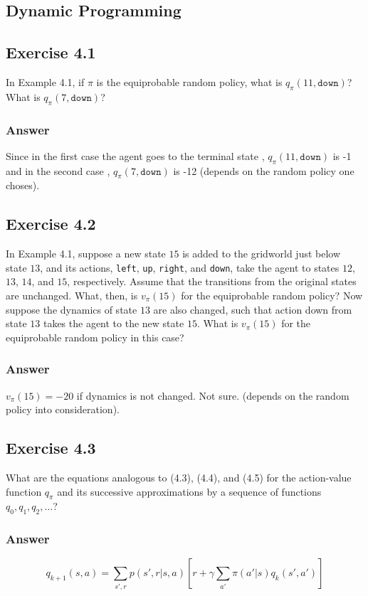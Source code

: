 \begin{Document}
\section{Dynamic Programming}
\subsection{Exercise 4.1}
In Example 4.1, if $\pi$ is the equiprobable random policy, what is $q_\pi(11, \mathtt{down})$? What is $q_\pi(7, \mathtt{down})$?
\subsubsection{Answer}
Since in the first case the agent goes to the terminal state , $q_\pi(11, \mathtt{down})$ is -1 and in the second case ,  $q_\pi(7, \mathtt{down})$ is -12 (depends on the random policy one choses).


\subsection{Exercise 4.2}
In Example 4.1, suppose a new state $15$ is added to the gridworld just below state $13$, and its actions, \texttt{left}, \texttt{up}, \texttt{right}, and \texttt{down}, take the agent to states $12$, $13$, $14$, and $15$, respectively. Assume that the transitions from the original states are unchanged. What, then, is $v_\pi(15)$ for the equiprobable random policy? Now suppose the dynamics of state $13$ are also changed, such that action down from state $13$ takes the agent to the new state $15$. What is $v_\pi(15)$ for the equiprobable random policy in this case?

\subsubsection{Answer}
$v_\pi(15) = -20$ if dynamics is not changed. Not sure. (depends on the random policy into consideration).

\subsection{Exercise 4.3}
What are the equations analogous to (4.3), (4.4), and (4.5) for the action-value function $q_\pi$ and its successive approximations by a sequence of functions $q_0, q_1, q_2, \dots$?

\subsubsection{Answer}
\begin{equation}
    q_{k+1}(s, a) = \sum_{s', r} p(s', r | s, a)\left[r + \gamma \sum_{a'} \pi(a'|s)q_k(s', a')\right]
\end{equation}


\end{Document}
